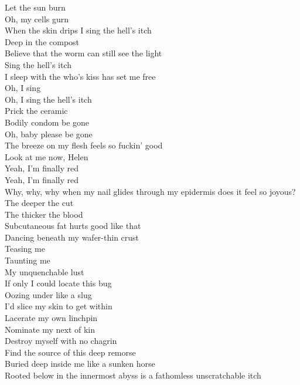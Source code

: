 Let the sun burn\\
Oh, my cells gurn\\
When the skin drips I sing the hell's itch\\
Deep in the compost\\
Believe that the worm can still see the light\\
Sing the hell's itch\\
I sleep with the  who's kiss has set me free\\
Oh, I sing\\
Oh, I sing the hell's itch\\
Prick the ceramic\\
Bodily condom be gone\\
Oh, baby please be gone\\
The breeze on my flesh feels so fuckin' good\\
Look at me now, Helen\\
Yeah, I'm finally red\\
Yeah, I'm finally red\\

Why, why, why when my nail glides through my epidermis does it feel so joyous?\\
The deeper the cut\\
The thicker the blood\\
Subcutaneous fat hurts good like that\\
Dancing beneath my wafer-thin crust\\
Teasing me\\
Taunting me\\
My unquenchable lust\\
If only I could locate this bug\\
Oozing under like a slug\\
I'd slice my skin to get within\\
Lacerate my own linchpin\\
Nominate my next of kin\\
Destroy myself with no chagrin\\
Find the source of this deep remorse\\
Buried deep inside me like a sunken horse\\
Rooted below in the innermost abyss is a fathomless unscratchable itch\\



